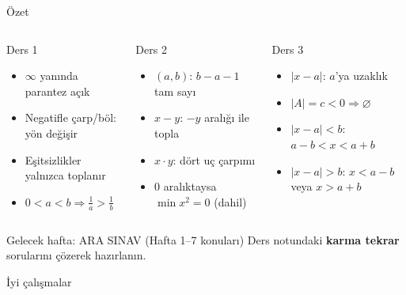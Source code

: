 \documentclass[aspectratio=169,11pt]{beamer}
\begin{document}
\begin{frame}{Özet}
\begin{columns}[t]
\begin{block}{Ders 1}
\small
\begin{itemize}
\item \(\infty\) yanında parantez açık
\item Negatifle çarp/böl: yön değişir
\item Eşitsizlikler yalnızca toplanır
\item \(0<a<b\Rightarrow \frac1a>\frac1b\)
\end{itemize}
\end{block}
\begin{block}{Ders 2}
\small
\begin{itemize}
\item \((a,b)\): \(b-a-1\) tam sayı
\item \(x-y\): \(-y\) aralığı ile topla
\item \(x\cdot y\): dört uç çarpımı
\item \(0\) aralıktaysa \(\min x^2=0\) (dahil)
\end{itemize}
\end{block}
\begin{block}{Ders 3}
\small
\begin{itemize}
\item \(|x-a|\): \(a\)'ya uzaklık
\item \(|A|=c<0\Rightarrow\varnothing\)
\item \(|x-a|<b\): \(a-b<x<a+b\)
\item \(|x-a|>b\): \(x<a-b\) veya \(x>a+b\)
\end{itemize}
\end{block}
\end{columns}
\vspace{2pt}
\begin{alertblock}{Gelecek hafta: ARA SINAV (Hafta 1--7 konuları)}
Ders notundaki \textbf{karma tekrar} sorularını çözerek hazırlanın.
\end{alertblock}
\end{frame}

\begin{frame}
\centering\Large İyi çalışmalar
\end{frame}
\end{document}
